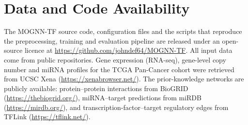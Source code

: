 \documentclass[review,3p,times,11pt, ]{elsarticle} %
\begin{document}
\section*{Data and Code Availability}
The MOGNN-TF source code, configuration files and the scripts that
reproduce the preprocessing, training and evaluation pipeline are
released under an open-source licence at
\url{https://github.com/johndef64/MOGNN-TF}.
All input data come from public repositories. Gene expression
(RNA-seq), gene-level copy number and miRNA profiles for the TCGA
Pan-Cancer cohort were retrieved from UCSC Xena
(\url{https://xenabrowser.net/}). The prior-knowledge networks are
publicly available: protein--protein interactions from BioGRID
(\url{https://thebiogrid.org/}), miRNA--target predictions from miRDB
(\url{https://mirdb.org/}), and transcription-factor--target regulatory
edges from TFLink (\url{https://tflink.net/}).


\begin{footnotesize}

    

    

\end{footnotesize}
\end{document}
